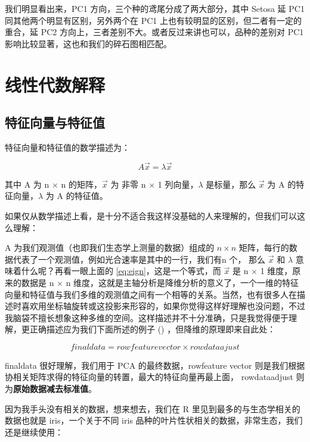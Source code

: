 \documentclass[
]{krantz}
\begin{document}
我们明显看出来，PC1 方向，三个种的鸢尾分成了两大部分，其中 Setosa 延 PC1 同其他两个明显有区别，另外两个在 PC1 上也有较明显的区别，但二者有一定的重合，延 PC2 方向上，三者差别不大。或者反过来讲也可以，品种的差别对 PC1 影响比较显著，这也和我们的碎石图相匹配。

\hypertarget{alge-pca}{%
\section{线性代数解释}\label{alge-pca}}

\hypertarget{egi-pca}{%
\subsection{特征向量与特征值}\label{egi-pca}}

特征向量和特征值的数学描述为：

\begin{equation}
A \vec{x} = \lambda \vec{x}
\label{eq:eign}
\end{equation}

其中 A 为 n \(\times\) n 的矩阵，\(\vec{x}\) 为 非零 n \(\times\) 1 列向量，\(\lambda\) 是标量，那么 \(\vec{x}\) 为 A 的特征向量，\(\lambda\) 为 A 的特征值。

如果仅从数学描述上看，是十分不适合我这样没基础的人来理解的，但我们可以这么理解：

A 为我们观测值（也即我们生态学上测量的数据）组成的 \(n \times n\) 矩阵，每行的数据代表了一个观测值，例如光合速率是其中的一行，我们有n 个， 那么 \(\vec{x}\) 和 \(\lambda\) 意味着什么呢？再看一眼上面的 \eqref{eq:eign}，这是一个等式，而 \(\vec{x}\) 是 n \(\times\) 1 维度，原来的数据是 n \(\times\) n 维度，这就是主轴分析是降维分析的意义了，一个一维的特征向量和特征值与我们多维的观测值之间有一个相等的关系。当然，也有很多人在描述时喜欢用坐标轴旋转或这投影来形容的，如果你觉得这样好理解也没问题，不过我脑袋不擅长想象这种多维的空间。这样描述并不十分准确，只是我觉得便于理解，更正确描述应为我们下面所述的例子 (\citet{Smith2002}) ，但降维的原理即来自此处：

\begin{equation}
finaldata = rowfeaturevector \times rowdataajust
\label{eq:despca}
\end{equation}

finaldata 很好理解，我们用于 PCA 的最终数据，rowfeature vector 则是我们根据协相关矩阵求得的特征向量的转置，最大的特征向量再最上面， rowdataadjust 则为\textbf{原始数据减去标准值}。

因为我手头没有相关的数据，想来想去，我们在 R 里见到最多的与生态学相关的数据也就是 iris，一个关于不同 iris 品种的叶片性状相关的数据，非常生态，我们还是继续使用：
\end{document}
